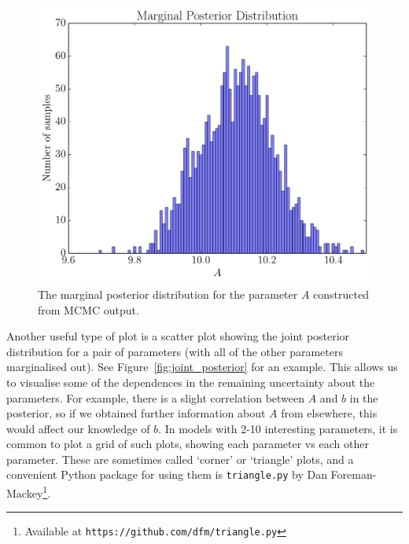 \begin{figure}
\begin{center}
\includegraphics[scale=0.5]{marginal_posterior.pdf}
\caption{The marginal posterior distribution for the parameter $A$ constructed
from MCMC output.\label{fig:marginal_posterior}}
\end{center}
\end{figure}

Another useful type of plot is a scatter plot showing the joint posterior
distribution for a pair of parameters (with all of the other parameters
marginalised out). See Figure~\ref{fig:joint_posterior} for an example.
This allows us to visualise some of the dependences in the remaining
uncertainty about the parameters. For example, there is a slight correlation
between $A$ and $b$ in the posterior, so if we obtained further information
about $A$ from elsewhere, this would affect our knowledge of $b$.
In models with 2-10 interesting parameters, it is common to plot a grid
of such plots, showing each parameter vs each other parameter. These are
sometimes called `corner' or `triangle' plots, and a convenient Python package
for using them is {\tt triangle.py} by Dan
Foreman-Mackey\footnote{Available at
{\tt https://github.com/dfm/triangle.py}}.

